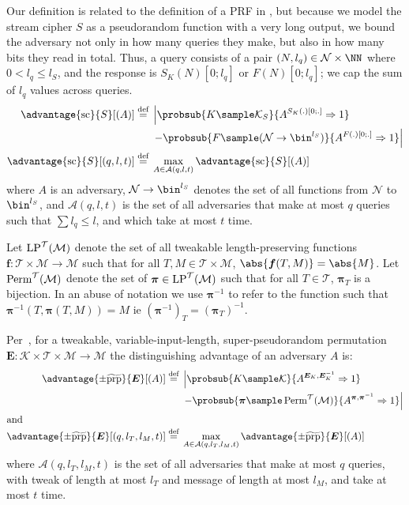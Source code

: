 \documentclass[eprint.tex]{subfiles}
\begin{document}
Our definition is related to the definition of a PRF in \cite{concsym}, but
because we model the stream cipher $S$ as a pseudorandom function with a very long output,
we bound the adversary not only in how many queries they make,
but also in how many bits they read in total.
Thus, a query consists of a pair
$(N, l_q) \in \mathcal{N} \times \NN$ where $0 < l_q \leq l_S$,
and the response is $S_K(N)[0;l_q]$ or $F(N)[0;l_q]$;
we cap the sum of $l_q$ values across queries.
%
\begin{align*}
    \advantage{\mathrm{sc}}{S}[(A)] \defeq
    {}&\left\lvert \probsub{K \sample \mathcal{K}_S}{A^{S_{K}(.)[0;.]}\Rightarrow 1}\right.
    \\
    {}&\left. - \probsub{F \sample (\mathcal{N} \rightarrow \bin^{l_S})}
    {A^{F(.)[0;.]}\Rightarrow 1} \right\rvert
    \\
    \advantage{\mathrm{sc}}{S}[(q, l, t)]
    \defeq {}&\max_{A \in \mathcal{A}(q, l, t)} \advantage{\mathrm{sc}}{S}[(A)]
\end{align*}
%
where $A$ is an adversary,
$\mathcal{N} \rightarrow \bin^{l_S}$ denotes the set of all
functions from $\mathcal{N}$ to $\bin^{l_S}$,
and
$\mathcal{A}(q, l, t)$
is the set of all adversaries that make at most $q$ queries such that
$\sum l_q \leq l$, and which take at most $t$ time.

Let $\operatorname{LP}^\mathcal{T}(\mathcal{M})$ denote the set of all
tweakable length-preserving functions
$\bm{f} : \mathcal{T} \times \mathcal{M} \rightarrow \mathcal{M}$
such that for all $T, M \in \mathcal{T} \times \mathcal{M}$,
$\abs{\bm{f}(T, M)} = \abs{M}$. Let $\operatorname{Perm}^\mathcal{T}(\mathcal{M})$ denote
the set of $\bm{\pi} \in \operatorname{LP}^\mathcal{T}(\mathcal{M})$ such that
for all $T \in \mathcal{T}$, $\bm{\pi}_{T}$ is a bijection.
In an abuse of notation
we use $\bm{\pi}^{-1}$ to refer to the function
such that $\bm{\pi}^{-1}(T, \bm{\pi}(T, M)) = M$ ie $(\bm{\pi}^{-1})_T = (\bm{\pi}_T)^{-1}$.

Per~\cite{cmc}, for a tweakable, variable-input-length, super-pseudorandom permutation
$\bm{E} : \mathcal{K} \times \mathcal{T} \times \mathcal{M} \rightarrow \mathcal{M}$
the distinguishing advantage of an adversary $A$ is:
%
\begin{align*}
    \advantage{\pm \widetilde{\mathrm{prp}}}{\bm{E}}[(A)] \defeq
    {}&\left\lvert\probsub{K \sample \mathcal{K}}{A^{\bm{E}_K,\bm{E}_K^{-1}}\Rightarrow 1}\right.
    \\
    {}&\left. - \probsub{\bm{\pi} \sample \Perm^\mathcal{T}(\mathcal{M})}
        {A^{\bm{\pi},\bm{\pi}^{-1}}\Rightarrow 1}\right\rvert
    \\
    \intertext{and}
    \advantage{\pm \widetilde{\mathrm{prp}}}{\bm{E}}[(q, l_T, l_M, t)]
    \defeq {}&
    \max_{A \in \mathcal{A}(q, l_T, l_M, t)} \advantage{\pm \widetilde{\mathrm{prp}}}{\bm{E}}[(A)]
\end{align*}
%
\begin{displaymath}
\end{displaymath}
where $\mathcal{A}(q, l_T, l_M, t)$
is the set of all adversaries that
make at most $q$ queries,
with tweak of length at most $l_T$
and message of length at most $l_M$,
and take at most $t$ time.
\end{document}
